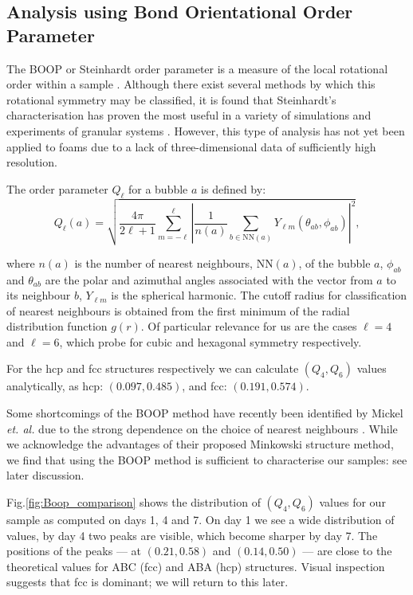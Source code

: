 \documentclass[10pt,a4paper]{article}
\begin{document}
\subsection{Analysis using Bond Orientational Order Parameter}

The BOOP or Steinhardt order parameter is a measure of the local rotational
order within a sample \cite{PhysRevB.28.784}. Although there exist several methods by which this
rotational symmetry may be classified, it is found that Steinhardt's characterisation has proven the most useful in a variety of simulations and experiments of granular systems \cite{lechner:114707,Aste2005}. However, this type of analysis has not yet been applied to foams due to a lack of three-dimensional data of sufficiently high resolution.

The order parameter $Q_\ell$ for a bubble $a$ is defined by:
\[ Q_\ell(a) = \sqrt{\frac{4\pi}{2\ell+1}\sum_{m=-\ell}^\ell \left| \frac{1}{n(a)} \sum_{b \in \text{NN}(a)} Y_{\ell m}(\theta_{ab},\phi_{ab}) \right|^2}, \]

where $n(a)$ is the number of nearest neighbours, $\text{NN}(a)$, of the bubble $a$, $\phi_{ab}$ and $\theta_{ab}$ are the polar and azimuthal angles associated with the vector from $a$ to its neighbour $b$, $Y_{\ell m}$ is the  spherical harmonic. The cutoff radius for classification of nearest neighbours
is obtained from the first minimum of the radial distribution function $g(r)$. Of particular relevance for us are the cases $\ell=4$ and $\ell=6$, which probe for cubic and hexagonal symmetry respectively.

For the hcp and fcc structures respectively we can calculate $(Q_4, Q_6)$ values analytically, as hcp: $(0.097,0.485)$, and fcc: $(0.191,0.574)$.

Some shortcomings of the BOOP method have recently been identified by Mickel \emph{et. al.} due to the strong dependence on the choice of nearest neighbours \cite{maestro2013liquid}. While we acknowledge the advantages of their proposed Minkowski structure method, we find that using the BOOP method is
sufficient to characterise our samples: see later discussion.


Fig.\ref{fig:Boop_comparison} shows the distribution of $(Q_4,Q_6)$ values for our sample as computed on days 1, 4 and 7. On day 1 we see a wide distribution of values, by day 4 two peaks are visible, which become sharper by day 7. The positions of the peaks --- at $(0.21,0.58)$ and $(0.14,0.50)$ --- are close to the theoretical values for ABC (fcc) and ABA (hcp) structures. Visual inspection suggests that fcc is dominant; we will return to this later.
\end{document}
